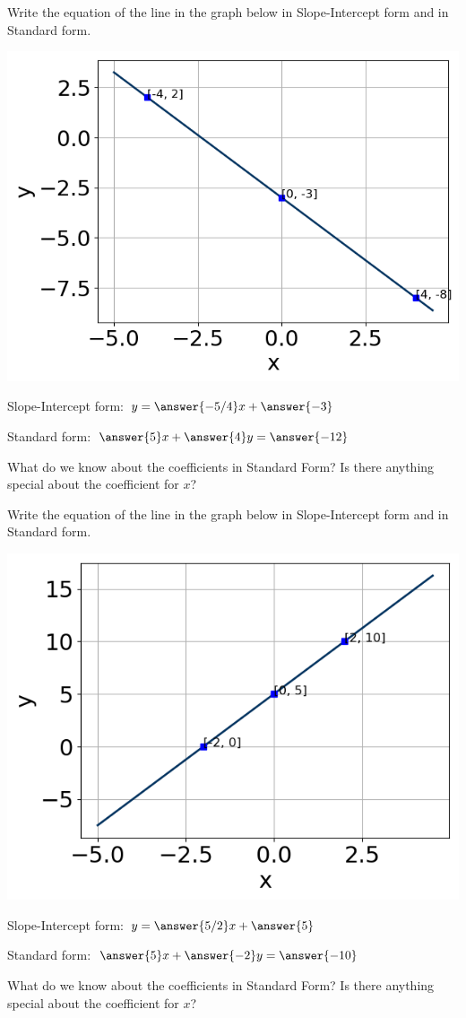 \documentclass{ximera}
\begin{document}
\begin{question}
Write the equation of the line in the graph below in Slope-Intercept form and in Standard form. 

\includegraphics{question2.png}

Slope-Intercept form: $y = \answer{-5/4}x + \answer{-3}$

Standard form: $\answer{5} x + \answer{4} y = \answer{-12}$

\begin{hint}
	What do we know about the coefficients in Standard Form? Is there anything special about the coefficient for $x$?
\end{hint}
\end{question}

\begin{question}
Write the equation of the line in the graph below in Slope-Intercept form and in Standard form. 

\includegraphics{question3.png}

Slope-Intercept form: $y = \answer{5/2}x + \answer{5}$

Standard form: $\answer{5} x + \answer{-2} y = \answer{-10}$

\begin{hint}
	What do we know about the coefficients in Standard Form? Is there anything special about the coefficient for $x$?
\end{hint}
\end{question}
\end{document}
